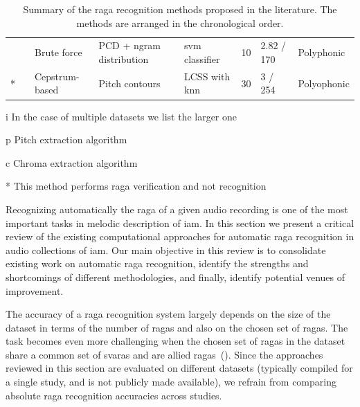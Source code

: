 \begin{table}
\begin{threeparttable}
\begin{centering}
\begin{tabular}{l l P{2cm} P{3cm} P{2.5cm} L{1cm} P{1.5cm} P{2cm}}
				\cite{kumar2014identifying} & \cite{Salamon2012} & Brute force & PCD + \acrshort{ngram} distribution & \acrshort{svm} classifier  & 10 & 2.82 / 170 & Polyphonic\tabularnewline
				\cite{shrey_ISMIR_2015}{*} & \cite{Salamon2012} & Cepstrum-based & Pitch contours & LCSS with \acrshort{knn} & 30 & 3 / 254 & Polyophonic\tabularnewline
				\hline 
			\end{tabular}
			\par \end{centering}
		\begin{tablenotes}
			\item[i] In the case of multiple datasets we list the larger one
			\item[p] Pitch extraction algorithm
			\item[c] Chroma extraction algorithm
			\item[*] This method performs \gls{raga} verification and not recognition
		\end{tablenotes}
		\caption{Summary of the \Gls{raga} recognition methods proposed in the literature. The methods are arranged in the chronological order. }
		\label{tab:raga_recognition_methods_details}
	\end{threeparttable}
\end{table}

Recognizing automatically the \gls{raga} of a given audio recording is one of the most important tasks in melodic description of \gls{iam}. In this section we present a critical review of the existing computational approaches for automatic \gls{raga} recognition in audio collections of \gls{iam}. Our main objective in this review is to consolidate existing work on automatic \gls{raga} recognition, identify the strengths and shortcomings of different methodologies, and finally, identify potential venues of improvement.

The accuracy of a \gls{raga} recognition system largely depends on the size of the dataset in terms of the number of \glspl{raga} and also on the chosen set of \glspl{raga}. The task becomes even more challenging when the chosen set of \glspl{raga} in the dataset share a common set of \glspl{svara} and are allied \glspl{raga}~(). Since the approaches reviewed in this section are evaluated on different datasets (typically compiled for a single study, and is not publicly made available), we refrain from comparing absolute \gls{raga} recognition accuracies across studies. 

